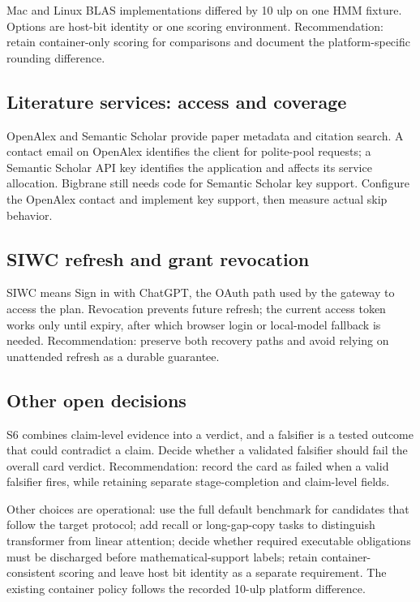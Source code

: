 Mac and Linux BLAS implementations differed by 10 ulp on one HMM fixture. Options are host-bit identity or one scoring environment. Recommendation: retain container-only scoring for comparisons and document the platform-specific rounding difference.

\subsection{Literature services: access and coverage}

OpenAlex and Semantic Scholar provide paper metadata and citation search. A contact email on OpenAlex identifies the client for polite-pool requests; a Semantic Scholar API key identifies the application and affects its service allocation. Bigbrane still needs code for Semantic Scholar key support. Configure the OpenAlex contact and implement key support, then measure actual skip behavior.

\subsection{SIWC refresh and grant revocation}

SIWC means Sign in with ChatGPT, the OAuth path used by the gateway to access the plan. Revocation prevents future refresh; the current access token works only until expiry, after which browser login or local-model fallback is needed. Recommendation: preserve both recovery paths and avoid relying on unattended refresh as a durable guarantee.

\subsection{Other open decisions}

S6 combines claim-level evidence into a verdict, and a falsifier is a tested outcome that could contradict a claim. Decide whether a validated falsifier should fail the overall card verdict. Recommendation: record the card as failed when a valid falsifier fires, while retaining separate stage-completion and claim-level fields.



Other choices are operational: use the full default benchmark for candidates that follow the target protocol; add recall or long-gap-copy tasks to distinguish transformer from linear attention; decide whether required executable obligations must be discharged before mathematical-support labels; retain container-consistent scoring and leave host bit identity as a separate requirement. The existing container policy follows the recorded 10-ulp platform difference.

